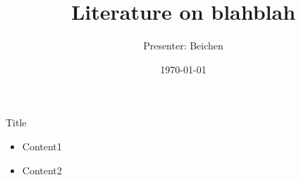 \documentclass{beamer}
\title{Literature on blahblah}
\author{Presenter: Beichen}
\date{\today}
\begin{document}
\begin{frame}
  \titlepage
\end{frame}

\begin{frame}{Title}
\begin{itemize}
  \item Content1
  \item Content2
\end{itemize}
\end{frame}
\end{document}
